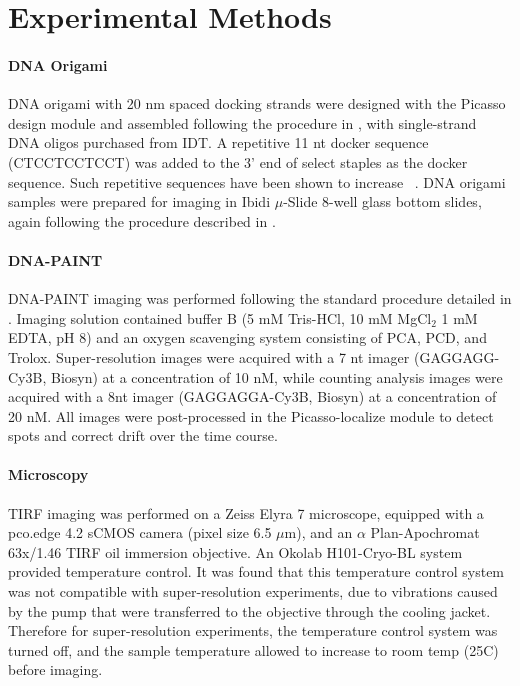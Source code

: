 \section{Experimental Methods}


\paragraph{DNA Origami}
DNA origami with 20 nm spaced docking strands were designed with the Picasso design module \cite{schnitzbauer_2017}
and assembled following the procedure in \cite{schnitzbauer_2017}, with single-strand DNA oligos purchased from IDT.
  A repetitive 11 nt docker sequence (CTCCTCCTCCT) was added to the 3' end of select staples as the docker sequence.
  Such repetitive sequences have been shown to increase \pon~\citep{civitci_2020}.
  DNA origami samples were prepared for imaging in Ibidi $\mu$-Slide 8-well glass bottom slides, 
  again following the procedure described in \cite{schnitzbauer_2017}. 
  
\paragraph{DNA-PAINT}
DNA-PAINT imaging was performed following the standard procedure detailed in \cite{schnitzbauer_2017}. 
  Imaging solution contained buffer B (5 mM Tris-HCl, 10 mM MgCl$_2$ 1 mM EDTA, pH 8) and an oxygen scavenging system consisting of PCA, PCD, and Trolox.
  Super-resolution images were acquired with a 7 nt imager (GAGGAGG-Cy3B, Biosyn) at a concentration of 10 nM,
  while counting analysis images were acquired with a 8nt imager (GAGGAGGA-Cy3B, Biosyn) at a concentration of 20 nM.
  All images were post-processed in the Picasso-localize module to detect spots and correct drift over the time course. 

\paragraph{Microscopy}

TIRF imaging was performed on a Zeiss Elyra 7 microscope, equipped with 
a pco.edge 4.2 sCMOS camera (pixel size 6.5 $\mu$m), and an $\alpha$ 
Plan-Apochromat 63x/1.46 TIRF oil immersion objective.
  An Okolab H101-Cryo-BL system provided temperature control. 
  It was found that this temperature control system was not compatible with super-resolution experiments, 
  due to vibrations caused by the pump that were transferred to the objective through the cooling jacket.
  Therefore for super-resolution experiments, the temperature control system was turned off, 
  and the sample temperature allowed to increase to room temp (25\textdegree C) before imaging.
